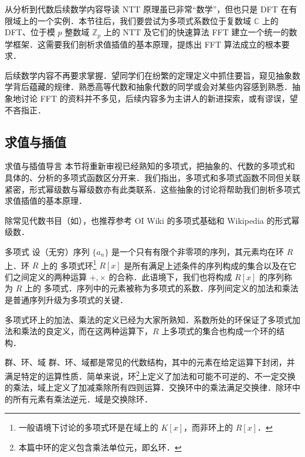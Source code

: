 \documentclass[fontset=fandol]{ctexbeamer}
\newcommand{\myemph}[1]{{\usebeamercolor[fg]{structure} #1}}
\begin{document}
\begin{frame}{从分析到代数}{后续数学内容导读}
    NTT 原理虽已非常“数学”，但也只是 DFT 在有限域上的一个实例．本节往后，我们要尝试为多项式系数位于复数域 $\mathbb C$ 上的 DFT、位于模 $p$ 整数域 $\mathbb Z_p$ 上的 NTT 及它们的快速算法 FFT 建立一个统一的数学框架．这需要我们剖析求值插值的基本原理，提炼出 FFT 算法成立的根本要求．

    后续数学内容不再要求掌握．望同学们在纷繁的定理定义中抓住要旨，窥见抽象数学背后蕴藏的规律．熟悉高等代数和抽象代数的同学或会对某些内容感到熟悉．抽象地讨论 FFT 的资料并不多见，后续内容多为主讲人的新进探索，或有谬误，望不吝指正．
\end{frame}

\subsection{求值与插值}

\begin{frame}{求值与插值}{导言}
    本节将重新审视已经熟知的多项式，把抽象的、代数的多项式和具体的、分析的多项式函数区分开来．我们指出，多项式和多项式函数不同但关联紧密，形式幂级数与幂级数亦有此类联系．这些抽象的讨论将帮助我们剖析多项式求值插值的基本原理．
    
    除常见代数书目（如\cite{qiu-algebra}），也推荐参考 OI Wiki 的多项式基础\cite{oiwiki-polynomial}和 Wikipedia 的形式幂级数\cite{wikipedia-formalpowerseries}．
\end{frame}

\begin{frame}{多项式}
    设（无穷）序列 $\{ a_n \}$ 是一个只有有限个非零项的序列，其元素均在环 $R$ 上．环 $R$ 上的\myemph{多项式环}\footnote{一般语境下讨论的多项式环是在域上的 $K[x]$，而非环上的 $R[x]$．} $R[x]$ 是所有满足上述条件的序列构成的集合以及在它们之间定义的两种运算 $+, \times$ 的合称．此语境下，我们也将构成 $R[x]$ 的序列称为 $R$ 上的\myemph{多项式}．序列中的元素被称为多项式的系数．\alert{序列间定义的加法和乘法是普通序列升级为多项式的关键．}

    多项式环上的加法、乘法的定义已经为大家所熟知．系数所处的环保证了多项式加法和乘法的良定义，而在这两种运算下，$R$ 上多项式的集合也构成一个环的结构．

    \begin{block}{群、环、域}
        群、环、域都是常见的代数结构，其中的元素在给定运算下封闭，并满足特定的运算性质．简单来说，环\footnote{本篇中环的定义包含乘法单位元，即幺环．}上定义了加法和可能不可逆的、不一定交换的乘法，域上定义了加减乘除所有四则运算．交换环中的乘法满足交换律．除环中的所有元素有乘法逆元．域是交换除环．
    \end{block}
\end{frame}
\end{document}
